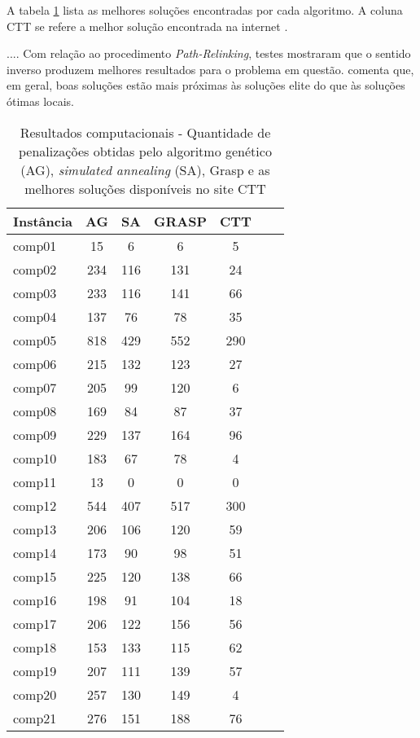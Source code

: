 \documentclass[11pt]{article}
\begin{document}
A tabela \ref{tabResultados} lista as melhores soluções encontradas por cada algoritmo. A coluna CTT se refere a melhor solução encontrada na internet \cite{ctt}.

.... Com relação ao procedimento \textit{Path-Relinking}, testes mostraram que o sentido inverso produzem melhores resultados para o problema em questão. \cite{grasp_resende_ribeiro} comenta que, em geral, boas soluções estão mais próximas às soluções elite do que às soluções ótimas locais.


\begin{table}

\centering
\begin{tabular}{|l|c|c|c|c|c|c|} 
\hline

Instância & AG & SA & GRASP & CTT &  \\ \hline

comp01 & 15 & 6 & 6 & 5 & \\
comp02 & 234 & 116 & 131 & 24 & \\
comp03 & 233 & 116 & 141 & 66 & \\
comp04 & 137 & 76 & 78 & 35 & \\
comp05 & 818 & 429 & 552 & 290 & \\
comp06 & 215 & 132 & 123 & 27 & \\
comp07 & 205 & 99 & 120 & 6 & \\
comp08 & 169 & 84 & 87 & 37 & \\
comp09 & 229 & 137 & 164 & 96 & \\
comp10 & 183 & 67 & 78 & 4 & \\
comp11 & 13 & 0 & 0 & 0 & \\
comp12 & 544 & 407 & 517 & 300 & \\
comp13 & 206 & 106 & 120 & 59 & \\
comp14 & 173 & 90 & 98 & 51 & \\
comp15 & 225 & 120 & 138 & 66 & \\
comp16 & 198 & 91 & 104 & 18 & \\
comp17 & 206 & 122 & 156 & 56 & \\
comp18 & 153 & 133 & 115 & 62 & \\
comp19 & 207 & 111 & 139 & 57 & \\
comp20 & 257 & 130 & 149 & 4 & \\
comp21 & 276 & 151 & 188 & 76 & \\
\hline
\end{tabular}
\caption{Resultados computacionais - Quantidade de penalizações obtidas pelo algoritmo genético (AG), \textit{simulated annealing} (SA), Grasp e as melhores soluções disponíveis no site CTT}
\label{tabResultados}
\end{table} 
\end{document}
